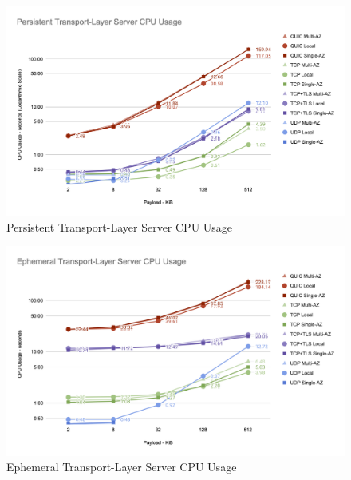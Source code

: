 \clearpage

\begin{figure}[h!]
    \centering
    \includegraphics[width=\linewidth]{figures/charts/Persistent Transport-Layer Server CPU Usage.png}
    \caption{Persistent Transport-Layer Server CPU Usage}
    \label{fig:persistent_server_transport_cpu}
\end{figure}

\begin{figure}[h!]
    \centering
    \includegraphics[width=\linewidth]{figures/charts/Ephemeral Transport-Layer Server CPU Usage.png}
    \caption{Ephemeral Transport-Layer Server CPU Usage}
    \label{fig:ephemeral_server_transport_cpu}
\end{figure}

\clearpage
